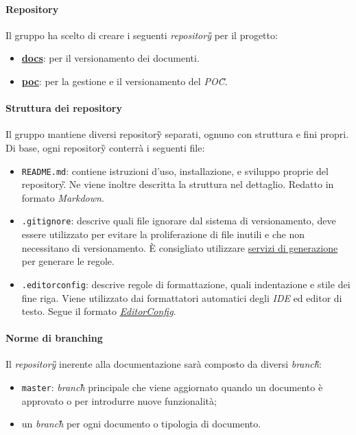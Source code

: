 		\paragraph*{Repository}
		\aCapo{}
			Il gruppo \teamname{} ha scelto di creare i seguenti \emph{repository\G{}} per il progetto:
			\begin{itemize}
				\item \href{https://github.com/Bug-s-Bunny-Team/docs}{\textbf{docs}}: per il versionamento dei documenti.
				\item \href{https://github.com/Bug-s-Bunny-Team/poc}{\textbf{poc}}: per la gestione e il versionamento del \textit{POC\G}.
			\end{itemize}

		\paragraph*{Struttura dei repository} %
		\aCapo{}  
		Il gruppo mantiene diversi repository\G{} separati, ognuno con struttura e fini propri.
		Di base, ogni repository\G{} conterrà i seguenti file:
		\begin{itemize}
			\item \verb#README.md#: contiene istruzioni d'uso, installazione, e sviluppo proprie del repository\G. Ne viene inoltre descritta la struttura nel dettaglio. Redatto in formato \textit{Markdown}.
			\item \verb#.gitignore#: descrive quali file ignorare dal sistema di versionamento, deve essere utilizzato per evitare la proliferazione di file inutili e che non necessitano di versionamento. È consigliato utilizzare \href{https://www.toptal.com/developers/gitignore}{servizi di generazione} per generare le regole.
			\item \verb#.editorconfig#: descrive regole di formattazione, quali indentazione e stile dei fine riga. Viene utilizzato dai formattatori automatici degli \textit{IDE} ed editor di testo. Segue il formato \href{https://editorconfig.org/}{\textit{EditorConfig}}.
		\end{itemize}

		\paragraph*{Norme di branching}
		\aCapo{}  
			Il \emph{repository\G{}} inerente alla documentazione sarà composto da diversi \textit{branch\G}:
			\begin{itemize}
				\item \verb#master#: \emph{branch}\G{} principale che viene aggiornato quando un documento è approvato o per introdurre nuove funzionalità; 
				\item un \textit{branch}\G{} per ogni documento o tipologia di documento.
			\end{itemize}
		
